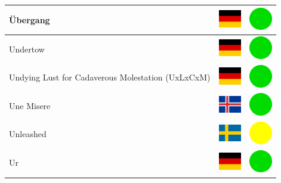 \documentclass[12pt, a4paper, twoside]{report}
\begin{document}
\begin{center}
\begin{longtable}{|p{5cm}|p{2cm}|p{2cm}|}
Übergang & \includegraphics[width=1cm]{4x3/de} & \includegraphics[width=1cm]{likes/y} \\ \hline
Undertow & \includegraphics[width=1cm]{4x3/de} & \includegraphics[width=1cm]{likes/y} \\ \hline
Undying Lust for Cadaverous Molestation (UxLxCxM) & \includegraphics[width=1cm]{4x3/de} & \includegraphics[width=1cm]{likes/y} \\ \hline
Une Misere & \includegraphics[width=1cm]{4x3/is} & \includegraphics[width=1cm]{likes/y} \\ \hline
Unleashed & \includegraphics[width=1cm]{4x3/se} & \includegraphics[width=1cm]{likes/m} \\ \hline
Ur & \includegraphics[width=1cm]{4x3/de} & \includegraphics[width=1cm]{likes/y} \\ \hline

\end{longtable}
\end{center}
\end{document}
